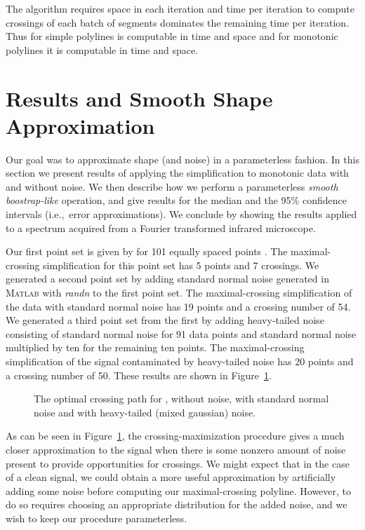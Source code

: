 \documentclass{article}
\begin{document}
The algorithm requires  space in each iteration and 
time per iteration to compute crossings of each batch of segments dominates
the remaining time per iteration.  Thus for simple polylines
 is computable in  time and
 space and for monotonic polylines it is computable in 
time and  space.

\section{Results and Smooth Shape Approximation}
\label{sect:monotonicresults}

Our goal was to approximate shape (and noise) in a parameterless fashion.  In
this section we present results of applying the simplification to monotonic
data with and without noise.  We then describe how we perform a
parameterless \emph{smooth boostrap-like} operation, and give results for the
median and the 95\% confidence intervals (i.e.,~error approximations).  We
conclude by showing the results applied to a spectrum acquired from a
Fourier transformed infrared microscope.

Our first point set is given by  for 101 equally
spaced points .  The maximal-crossing simplification for this
point set has 5 points and 7 crossings.  We generated a second point set by
adding standard normal noise generated in \textsc{Matlab} with
\textit{randn} to the first point set.  The maximal-crossing simplification
of the data with standard normal noise has 19 points and a crossing number
of 54.  We generated a third point set from the first by adding
heavy-tailed noise consisting of standard normal noise for 91 data points
and standard normal noise multiplied by ten for the remaining ten points. 
The maximal-crossing simplification of the signal contaminated by
heavy-tailed noise has 20 points and a crossing number of 50.  These results
are shown in Figure~\ref{fig:cleanresults}.
	
\begin{figure}
\qquad
{}
\qquad
{}
\caption{The optimal crossing path for , without
noise, with standard normal noise and with heavy-tailed (mixed gaussian)
noise.}
\label{fig:cleanresults}
\end{figure}

As can be seen in Figure~\ref{fig:cleanresults}, the crossing-maximization
procedure gives a much closer approximation to the signal when there is some
nonzero amount of noise present to provide opportunities for crossings.  We
might expect that in the case of a clean signal, we could obtain a more
useful approximation by artificially adding some noise before computing our
maximal-crossing polyline.  However, to do so requires choosing an
appropriate distribution for the added noise, and we wish to keep our
procedure parameterless.
\end{document}
